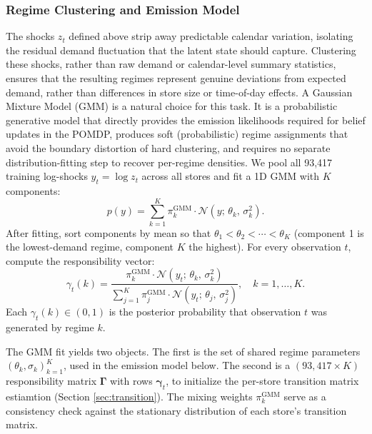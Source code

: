 \documentclass[preprint,11pt,authoryear]{elsarticle}
\theoremstyle{remark}
\begin{document}
\subsubsection*{Regime Clustering and Emission Model}
\label{sec:gmm}

The shocks $z_t$ defined above strip away predictable calendar variation, isolating the residual demand fluctuation that the latent state should capture. Clustering these shocks, rather than raw demand or calendar-level summary statistics, ensures that the resulting regimes represent genuine deviations from expected demand, rather than differences in store size or time-of-day effects. A Gaussian Mixture Model (GMM) is a natural choice for this task. It is a probabilistic generative model that directly provides the emission likelihoods required for belief updates in the POMDP, produces soft (probabilistic) regime assignments that avoid the boundary distortion of hard clustering, and requires no separate distribution-fitting step to recover per-regime densities. We pool all 93,417 training log-shocks $y_t = \log z_t$ across all stores and fit a 1D GMM with $K$ components:
\begin{equation}
    p(y) = \sum_{k=1}^{K} \pi_k^{\text{GMM}} \cdot \mathcal{N}(y;\, \theta_k,\, \sigma_k^2).
    \label{eq:gmm}
\end{equation}
After fitting, sort components by mean so that $\theta_1 < \theta_2 < \cdots < \theta_K$ (component 1 is the lowest-demand regime, component $K$ the highest). For every observation $t$, compute the responsibility vector:
\begin{equation}
    \gamma_t(k) = \frac{\pi_k^{\text{GMM}} \cdot \mathcal{N}(y_t;\,\theta_k,\,\sigma_k^2)}
                       {\displaystyle\sum_{j=1}^{K} \pi_j^{\text{GMM}} \cdot \mathcal{N}(y_t;\,\theta_j,\,\sigma_j^2)},
    \quad k = 1,\ldots,K.
    \label{eq:responsibility}
\end{equation}
Each $\gamma_t(k) \in (0,1)$ is the posterior probability that observation $t$ was generated by regime $k$.

The GMM fit yields two objects. The first is the set of shared regime parameters $(\theta_k, \sigma_k)_{k=1}^K$, used in the emission model below. The second is a $(93,417 \times K)$ responsibility matrix $\bm{\Gamma}$ with rows $\bm{\gamma}_t$, to initialize the per-store transition matrix estiamtion (Section \ref{sec:transition}). The mixing weights $\pi_k^{\text{GMM}}$ serve as a consistency check against the stationary distribution of each store's transition matrix.
\end{document}
